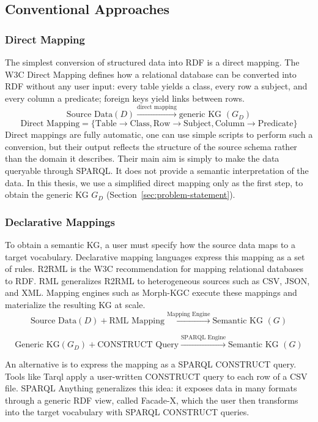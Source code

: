 \subsection{Conventional Approaches}
\label{sec:rw-conventional}

\subsubsection{Direct Mapping}
The simplest conversion of structured data into RDF is a direct mapping. The W3C Direct Mapping \citep{w3c2012directmapping} defines how a relational database can be converted into RDF without any user input: every table yields a class, every row a subject, and every column a predicate; foreign keys yield links between rows.
\[
\text{Source Data} (D) \xrightarrow{\text{direct mapping}} \text{generic KG } (G_D)
\]
\[
\text{Direct Mapping} = \{ \text{Table} \rightarrow \text{Class}, \text{Row} \rightarrow \text{Subject}, \text{Column} \rightarrow \text{Predicate} \}
\]
Direct mappings are fully automatic, one can use simple scripts to perform such a conversion, but their output reflects the structure of the source schema rather than the domain it describes. Their main aim is simply to make the data queryable through SPARQL\@. It does not provide a semantic interpretation of the data. In this thesis, we use a simplified direct mapping only as the first step, to obtain the generic KG \(G_D\) (Section~\ref{sec:problem-statement}).

\subsubsection{Declarative Mappings}
To obtain a semantic KG, a user must specify how the source data maps to a target vocabulary. Declarative mapping languages express this mapping as a set of rules. R2RML \citep{das2012r2rml} is the W3C recommendation for mapping relational databases to RDF\@. RML \citep{dimou2014rml} generalizes R2RML to heterogeneous sources such as CSV, JSON, and XML\@. Mapping engines such as Morph-KGC \citep{arenas2024morphkgc} execute these mappings and materialize the resulting KG at scale.
\[
\text{Source Data} (D) + \text{RML Mapping} \xrightarrow{\text{Mapping Engine}} \text{Semantic KG } (G)
\]

\[
\text{Generic KG} (G_D) + \text{CONSTRUCT Query} \xrightarrow{\text{SPARQL Engine}} \text{Semantic KG } (G)
\]

An alternative is to express the mapping as a SPARQL CONSTRUCT query. Tools like Tarql \citep{tarql} apply a user-written CONSTRUCT query to each row of a CSV file. SPARQL Anything \citep{asprino2023facade} generalizes this idea: it exposes data in many formats through a generic RDF view, called Facade-X, which the user then transforms into the target vocabulary with SPARQL CONSTRUCT queries.


